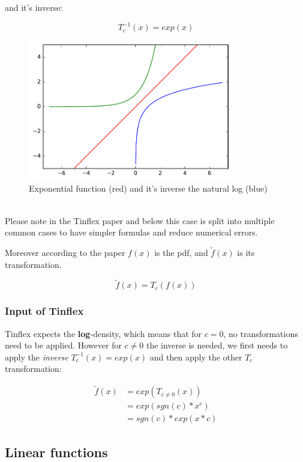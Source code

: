 \documentclass[]{article}
\begin{document}
and it's inverse:

\[T_c^{-1}(x) = exp(x) \]


\begin{figure}[p]
\centering
\includegraphics[width=0.8\textwidth]{figs/log_exp}
\caption{Exponential function (red) and it's inverse the natural log (blue)}
\label{fig:log_exp}
\end{figure}

\ \\

Please note in the Tinflex paper and below this case is split into multiple common cases to have simpler formulas and reduce numerical errors.

Moreover according to the paper $f(x)$ is the pdf, and $\tilde{f}(x)$ is its transformation.

\[\tilde{f}(x) = T_c(f(x))  \]

\subsubsection{Input of Tinflex}

Tinflex expects the \textbf{log}-density, which means that for $c = 0$, no transformations need to be applied.
However for $c \neq 0$ the inverse is needed, we first needs to apply the \textit{inverse} $T_c^{-1}(x) = exp(x)$ and then apply the other $T_c$ transformation:

\begin{align*}
\tilde{f}(x) &= exp(T_{c \neq 0}(x)) \\
&= exp(sgn(c) * x^c) \\
&= sgn(c) * exp(x * c)
\end{align*}

\subsection{Linear functions}
\end{document}

